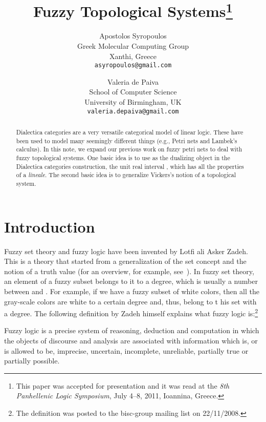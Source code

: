 \documentclass[11pt]{article}
\newenvironment{definition}[1][Definition]{\begin{trivlist}
\item[\hskip \labelsep {\bfseries #1}]}{\end{trivlist}}
\begin{document}
\title{Fuzzy Topological Systems\thanks{This paper was accepted for presentation and it was 
    read at the {\em 8th Panhellenic Logic Symposium}, July 4--8, 2011, Ioannina, Greece.}}
\author{Apostolos Syropoulos\\ 
        Greek Molecular Computing Group\\
        Xanthi, Greece\\
        \texttt{asyropoulos@gmail.com}\\
\and 
       Valeria de Paiva\\
       School of Computer Science\\
       University of Birmingham, UK\\
       \texttt{valeria.depaiva@gmail.com}\\
}
\date{}
\maketitle
\begin{abstract}
Dialectica categories are a very versatile categorical model of linear logic. 
These have been used to model many seemingly different things (e.g.,
Petri nets and Lambek's calculus). In this note, we expand our previous
work on fuzzy petri nets to deal with fuzzy topological systems. One basic idea is 
to use as the dualizing object in the Dialectica categories construction, 
the unit real interval ,  which has all the properties of a 
{\em lineale}. The second basic idea is to generalize Vickers's notion of a 
topological system.
\end{abstract}
\section{Introduction}
Fuzzy set theory and fuzzy logic have been invented by Lotfi ali Asker Zadeh. 
This is a theory that started from a generalization of the set concept and the 
notion of a truth value (for an overview, for example, see~\cite{klir95}). In fuzzy 
set theory, an element of a fuzzy subset belongs to it to a degree, which is usually 
a number between  and . For example, if we have a fuzzy subset of white colors, 
then all the gray-scale colors are white to a certain degree and, thus, belong to t
his set with a degree. The following definition by Zadeh himself explains what  fuzzy logic 
is:\footnote{The definition was posted to the bisc-group mailing list on 22/11/2008.}        
\begin{definition}
Fuzzy logic is a precise system of reasoning, deduction and computation in which 
the objects of discourse and analysis are associated with information which is, or 
is allowed to be, imprecise, uncertain, incomplete, unreliable, partially true or 
partially possible. 
\end{definition}
\end{document}

